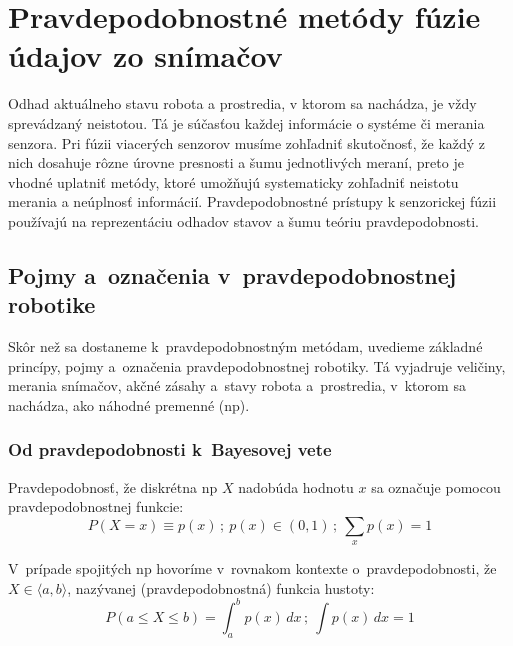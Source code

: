 \section{Pravdepodobnostné metódy fúzie údajov zo snímačov}

  Odhad aktuálneho stavu robota a prostredia, v ktorom sa nachádza, je vždy sprevádzaný neistotou. Tá je súčasťou každej informácie o systéme či merania senzora. Pri fúzii viacerých senzorov musíme zohľadniť skutočnosť, že každý z nich dosahuje rôzne úrovne presnosti a šumu jednotlivých meraní, preto je vhodné uplatniť metódy, ktoré umožňujú systematicky zohľadniť neistotu merania a neúplnosť informácií. Pravdepodobnostné prístupy k senzorickej fúzii používajú na reprezentáciu odhadov stavov a šumu teóriu pravdepodobnosti.

  \subsection{Pojmy a~označenia v~pravdepodobnostnej robotike}

    Skôr než sa dostaneme k~pravdepodobnostným metódam, uvedieme základné princípy, pojmy a~označenia pravdepodobnostnej robotiky. Tá vyjadruje veličiny, merania snímačov, akčné zásahy a~stavy robota a~prostredia, v~ktorom sa nachádza, ako náhodné premenné (\acrshort{np}).

    \subsubsection{Od pravdepodobnosti k~Bayesovej vete}

      Pravdepodobnosť, že diskrétna \acrshort{np} $X$ nadobúda hodnotu $x$ sa označuje pomocou pravdepodobnostnej funkcie:
      \begin{equation}
        P(X = x) \equiv p(x)\,;\ p(x) \in (0,1)\,;\ \sum_x p(x) = 1
      \end{equation}

      V~prípade spojitých \acrshort{np} hovoríme v~rovnakom kontexte o~pravdepodobnosti, že $X \in \langle a,b \rangle$, nazývanej (pravdepodobnostná) funkcia hustoty:
      \begin{equation}
        P(a \leq X \leq b) = \int_{a}^{b} p(x)\, dx\,;\ \int p(x)\, dx = 1
      \end{equation}

